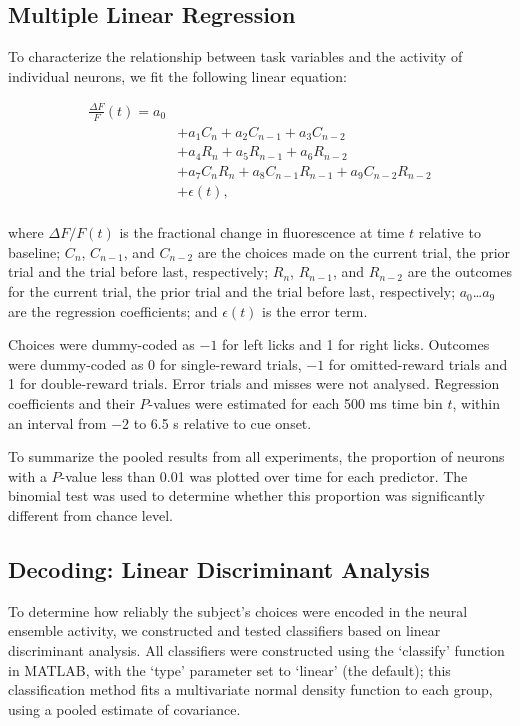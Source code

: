 \subsection*{Multiple Linear Regression}
To characterize the relationship between task variables and the activity of individual neurons, we fit the following linear equation:

\begin{equation*}
\begin{split}
\frac{\Delta F}{F}(t) = a_0 \\
&+ a_1 C_{n}        + a_2 C_{n-1}       + a_3 C_{n-2} \\
&+ a_4 R_{n}        + a_5 R_{n-1}       + a_6 R_{n-2} \\ 
&+ a_{7}C_{n}R_{n}  + a_8C_{n-1}R_{n-1} + a_9C_{n-2}R_{n-2} \\ 
&+ \epsilon(t),\\
\end{split} 
\end{equation*}

\noindent where $\Delta F/F(t)$ is the fractional change in fluorescence at time $t$ relative to baseline; $C_{n}$, $C_{n-1}$, and $C_{n-2}$ are the choices made on the current trial, the prior trial and the trial before last, respectively; $R_{n}$, $R_{n-1}$, and $R_{n-2}$ are the outcomes for the current trial, the prior trial and the trial before last, respectively; $a_0$…$a_9$ are the regression coefficients; and $\epsilon (t)$ is the error term. 

Choices were dummy-coded as $-1$ for left licks and 1 for right licks. Outcomes were dummy-coded as 0 for single-reward trials, $-1$ for omitted-reward trials and 1 for double-reward trials. Error trials and misses were not analysed. Regression coefficients and their $P$-values were estimated for each 500 ms time bin $t$, within an interval from $-2$ to 6.5 s relative to cue onset. 

To summarize the pooled results from all experiments, the proportion of neurons with a $P$-value less than 0.01 was plotted over time for each predictor. The binomial test was used to determine whether this proportion was significantly different from chance level.

\subsection*{Decoding: Linear Discriminant Analysis}
To determine how reliably the subject’s choices were encoded in the neural ensemble activity, we constructed and tested classifiers based on linear discriminant analysis. All classifiers were constructed using the ‘classify’ function in MATLAB, with the ‘type’ parameter set to ‘linear’ (the default); this classification method fits a multivariate normal density function to each group, using a pooled estimate of covariance. 

